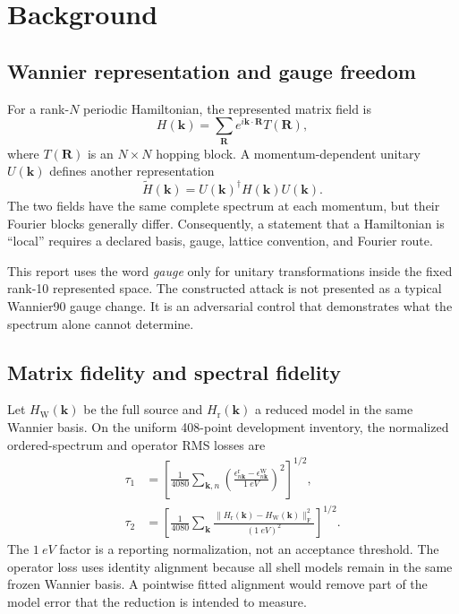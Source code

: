 \documentclass[11pt]{article}
\newcommand{\Hsrc}{H_{\mathrm W}}
\newcommand{\Hred}{H_{\mathrm r}}
\newcommand{\kvec}{\mathbf{k}}
\newcommand{\Rvec}{\mathbf{R}}
\begin{document}
\section{Background}

\subsection{Wannier representation and gauge freedom}

For a rank-\(N\) periodic Hamiltonian, the represented matrix field is
\begin{equation}
  H(\kvec)=\sum_{\Rvec} e^{i\kvec\cdot\Rvec}T(\Rvec),
  \label{eq:fourier}
\end{equation}
where \(T(\Rvec)\) is an \(N\times N\) hopping block.  A momentum-dependent unitary
\(U(\kvec)\) defines another representation
\begin{equation}
  \widetilde H(\kvec)=U(\kvec)^\dagger H(\kvec)U(\kvec).
  \label{eq:gauge}
\end{equation}
The two fields have the same complete spectrum at each momentum, but their Fourier
blocks generally differ.  Consequently, a statement that a Hamiltonian is ``local''
requires a declared basis, gauge, lattice convention, and Fourier route.

This report uses the word \emph{gauge} only for unitary transformations inside the fixed
rank-10 represented space.  The constructed attack is not presented as a typical
Wannier90 gauge change.  It is an adversarial control that demonstrates what the
spectrum alone cannot determine.

\subsection{Matrix fidelity and spectral fidelity}

Let \(\Hsrc(\kvec)\) be the full source and \(\Hred(\kvec)\) a reduced model in the
same Wannier basis.  On the uniform 408-point development inventory, the normalized
ordered-spectrum and operator RMS losses are
\begin{align}
  \tau_1
  &=\left[\frac{1}{4080}\sum_{\kvec,n}
    \left(\frac{\epsilon_{n\kvec}^{\mathrm r}
    -\epsilon_{n\kvec}^{\mathrm W}}{\SI{1}{eV}}\right)^2\right]^{1/2},
  \label{eq:tau1}\\
  \tau_2
  &=\left[\frac{1}{4080}\sum_{\kvec}
    \frac{\|\Hred(\kvec)-\Hsrc(\kvec)\|_{\mathrm F}^2}
    {(\SI{1}{eV})^2}\right]^{1/2}.
  \label{eq:tau2}
\end{align}
The \(\SI{1}{eV}\) factor is a reporting normalization, not an acceptance threshold.
The operator loss uses identity alignment because all shell models remain in the same
frozen Wannier basis.  A pointwise fitted alignment would remove part of the model error
that the reduction is intended to measure.
\end{document}
